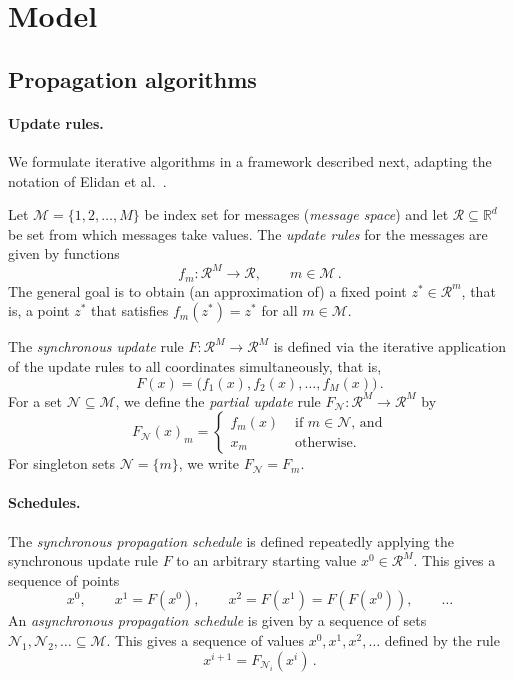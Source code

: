 \documentclass[11pt,a4paper]{article}
\theoremstyle{remark}
\newcommand{\Reals}{\mathbb{R}}
\newcommand{\R}{\mathcal{R}}
\newcommand{\M}{\mathcal{M}}
\newcommand{\N}{\mathcal{N}}
\begin{document}
    
\section{Model}

\subsection{Propagation algorithms}

\paragraph{Update rules.}
We formulate iterative algorithms in a framework described next, adapting the notation of Elidan et al.~\cite{elidan2006residual}.

Let $\M = \{ 1, 2, \dotsc, M \}$ be index set for messages (\emph{message space}) and let $\R \subseteq \Reals^d$ be set from which messages take values. The \emph{update rules} for the messages are given by functions
\[ f_m \colon \R^M \to \R, \qquad m \in \M\,.\]
The general goal is to obtain (an approximation of) a fixed point $z^* \in \R^m$, that is, a point $z^*$ that satisfies $f_m(z^*) = z^*$ for all $m \in \M$.

The \emph{synchronous update} rule $F \colon \R^M \to \R^M$ is defined via the iterative application of the update rules to all coordinates simultaneously, that is, 
\[ F(x) = \bigl( f_1(x), f_2(x), \dotsc, f_M(x) \bigr)\,.\]
For a set $\N \subseteq \M$, we define the \emph{partial update} rule $F_\N \colon \R^M \to \R^M$ by
\[ F_{\N}(x)_m = 
\begin{cases}
f_m(x) & \text{ if $m \in \N$, and}\\
x_m & \text{ otherwise.}
\end{cases} \]
For singleton sets $\N = \{ m\}$, we write $F_\N = F_m$.

\paragraph{Schedules.} The \emph{synchronous propagation schedule} is defined repeatedly applying the synchronous update rule $F$ to an arbitrary starting value $x^0 \in \R^M$. This gives a sequence of points
\[ x^0,\qquad x^1 = F(x^0),\qquad x^2 = F(x^1) = F(F(x^0)),\qquad \dotsc\]
An \emph{asynchronous propagation schedule} is given by a sequence of sets $\N_1, \N_2, \dotsc \subseteq \M$. This gives a sequence of values $x^0, x^1, x^2, \dotsc$ defined by the rule
\[ x^{i+1} = F_{\N_i}(x^i)\,.\]
\end{document}
